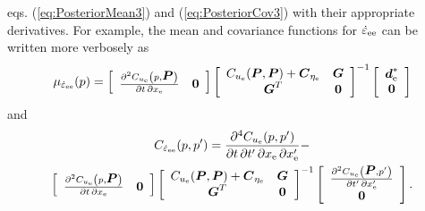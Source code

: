 \documentclass[extra,mreferee]{gji}
\begin{document}
eqs. (\ref{eq:PosteriorMean3}) and (\ref{eq:PosteriorCov3}) with their
appropriate derivatives. For example, the mean and covariance
functions for $\dot\varepsilon_{\mathrm{e}\mathrm{e}}$ can be written more verbosely as
\begin{equation}\label{eq:StrainMeanEE}
\mu_{\strain_{\e\e}}(p) = \left[\begin{array}{cc}
                          \frac{\partial^2 C_{u_\e}\left( p,\points \right)}{\partial t \, \partial x_\e} & 
                          \zeros \\
                          \end{array}\right]
                          \left[\begin{array}{cc}
                          C_{u_\e}(\points,\points) + \mitbf{C}_{\eta_\e} & \G \\
                          \G^T  & \zeros \\
                          \end{array}\right]^{-1}
                          \left[\begin{array}{c}
                          \data^*_\e \\
                          \zeros \\
                          \end{array}\right]
\end{equation}    
and
\begin{multline}\label{eq:StrainCovEE}
C_{\strain_{\e\e}}(p,p') = \frac{\partial^4 C_{u_\e}(p,p')}{\partial t \, \partial t' \, \partial x_\e \, \partial x'_\e} - \\
                           \left[\begin{array}{cc}
                           \frac{\partial^2 C_{u_\e}\left( p,\points \right)}{\partial t \, \partial x_\e} & \zeros \\
                           \end{array}\right]
                           \left[\begin{array}{cc}
                           C_{u_\e}(\points,\points) + \mitbf{C}_{\eta_\e} & \G \\
                           \G^T  & \zeros \\
                           \end{array}\right]^{-1}
                           \left[\begin{array}{c}
                           \frac{\partial^2 C_{u_\e}\left(\points, p' \right)}{\partial t' \, \partial x'_\e} \\
                           \zeros \\
                           \end{array}\right].
\end{multline}    
\end{document}
